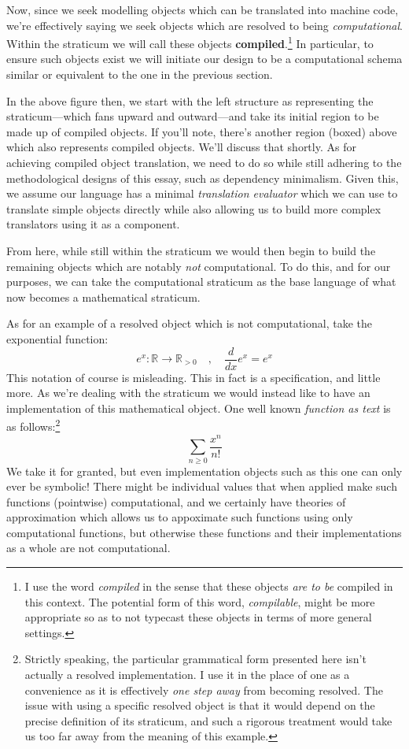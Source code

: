 \documentclass[twoside]{article}
\newcommand{\strong}[1]{{\bfseries #1}}
\begin{document}
Now, since we seek modelling objects which can be translated into machine code, we're effectively saying we seek objects which
are resolved to being \emph{computational}. Within the straticum we will call these objects \strong{compiled}.\footnote{I use
the word \emph{compiled} in the sense that these objects \emph{are to be} compiled in this context. The potential form of this
word, \emph{compilable}, might be more appropriate so as to not typecast these objects in terms of more general settings.} In
particular, to ensure such objects exist we will initiate our design to be a computational schema similar or equivalent to
the one in the previous section.

In the above figure then, we start with the left structure as representing the straticum---which fans upward and outward---and
take its initial region to be made up of compiled objects. If you'll note, there's another region (boxed) above which also
represents compiled objects. We'll discuss that shortly. As for achieving compiled object translation, we need to do so while
still adhering to the methodological designs of this essay, such as dependency minimalism. Given this, we assume our language
has a minimal \emph{translation evaluator} which we can use to translate simple objects directly while also allowing us
to build more complex translators using it as a component.

From here, while still within the straticum we would then begin to build the remaining objects which are notably \emph{not}
computational. To do this, and for our purposes, we can take the computational straticum as the base language of what now becomes
a mathematical straticum.

As for an example of a resolved object which is not computational, take the exponential function:
$$ e^x:\mathbb{R}\to\mathbb{R}_{>0} \quad,\quad \frac{d}{dx} e^x=e^x $$
This notation of course is misleading. This in fact is a specification, and little more. As we're dealing with the straticum
we would instead like to have an implementation of this mathematical object. One well known \emph{function as text} is as
follows:\footnote{Strictly speaking, the particular grammatical form presented here isn't actually a resolved implementation.
I use it in the place of one as a convenience as it is effectively \emph{one step away} from becoming resolved. The issue
with using a specific resolved object is that it would depend on the precise definition of its straticum, and such a rigorous
treatment would take us too far away from the meaning of this example.}
$$ \sum_{n\ge 0}\frac{x^n}{n!} $$
We take it for granted, but even implementation objects such as this one can only ever be symbolic! There might be individual
values that when applied make such functions (pointwise) computational, and we certainly have theories of approximation which
allows us to appoximate such functions using only computational functions, but otherwise these functions and their implementations
as a whole are not computational.
\end{document}

